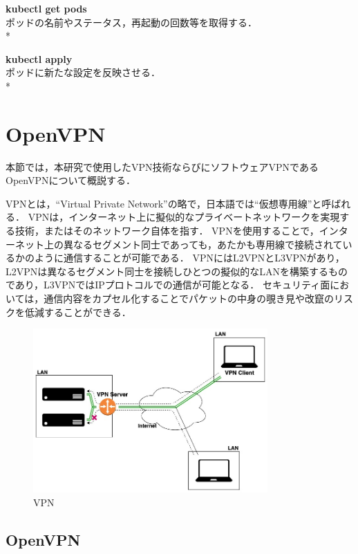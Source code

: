 {\bf kubectl get pods}\\
ポッドの名前やステータス，再起動の回数等を取得する．\\*

{\bf kubectl apply}\\
ポッドに新たな設定を反映させる．\\*

\section{OpenVPN}
\label{background:openvpn}

本節では，本研究で使用したVPN技術ならびにソフトウェアVPNであるOpenVPNについて概説する．

VPNとは，``Virtual Private Network''の略で，日本語では``仮想専用線''と呼ばれる．
VPNは，インターネット上に擬似的なプライベートネットワークを実現する技術，またはそのネットワーク自体を指す．
VPNを使用することで，インターネット上の異なるセグメント同士であっても，あたかも専用線で接続されているかのように通信することが可能である．
VPNにはL2VPNとL3VPNがあり，L2VPNは異なるセグメント同士を接続しひとつの擬似的なLANを構築するものであり，L3VPNではIPプロトコルでの通信が可能となる．
セキュリティ面においては，通信内容をカプセル化することでパケットの中身の覗き見や改竄のリスクを低減することができる．

\begin{figure}[htbp]
\begin{center}
    \includegraphics[width=0.8\textwidth]{./figures/openvpn.jpg}
    \caption{VPN}
\end{center}
\end{figure}

\subsection{OpenVPN}

